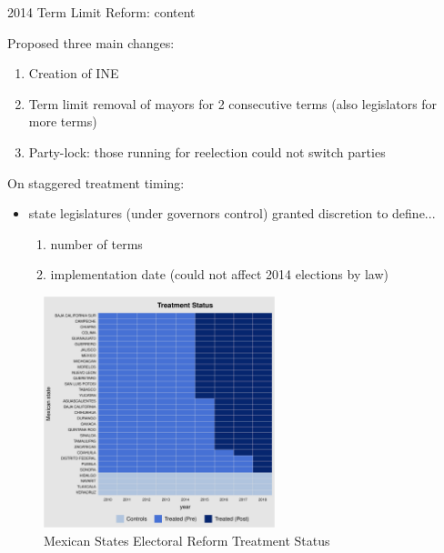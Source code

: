 \documentclass{beamer}
\begin{document}
\begin{frame}[label=reform_content]{2014 Term Limit Reform: content}

 \hyperlink{reform_background}{} 
 
 Proposed three main changes:
\begin{enumerate}
	\item Creation of INE
	\item Term limit removal of mayors for 2 consecutive terms (also legislators for more terms)
	\item Party-lock: those running for reelection could not switch parties
\end{enumerate}
\bigskip
On staggered treatment timing: 
\begin{itemize}
	\item state legislatures (under governors control) granted discretion to define...
	\begin{enumerate}
	\item number of terms 
	\item implementation date (could not affect 2014 elections by law)
	\end{enumerate}  
\end{itemize}
 
\end{frame} 
\begin{frame}[label=reform] 
\begin{figure}[H]   
\centering 
\caption{Mexican States Electoral Reform Treatment Status}
\label{fig:treatment_status}
\includegraphics[width=0.6\textwidth]{Figures_pres/reform_treatmentstatus.pdf}     
\captionsetup{justification=centering} 
\end{figure}      

\end{frame} 
\end{document}

